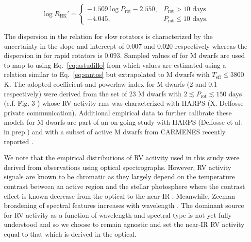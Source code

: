 \begin{equation}
  \log{R_{\text{HK}}'}  =
  \begin{cases}
    -1.509 \log{P_{\text{rot}}} -2.550, & P_{\text{rot}} > 10 \text{ days} \\
    -4.045, & P_{\text{rot}} \leq 10 \text{ days}.
  \end{cases} \label{eq:astudillo}
\end{equation}

\noindent The dispersion in the relation for slow rotators is characterized by the uncertainty in the slope and
intercept of 0.007 and 0.020 respectively whereas the dispersion in \Rhk{} for rapid rotators is 0.093. Sampled
values of \prot{} for M dwarfs are used to map to \Rhk{} using Eq.~\ref{eq:astudillo} from which \sigact{} values
are estimated using a relation similar to Eq.~\ref{eq:santos} but extrapolated to M dwarfs 
with $T_{\text{eff}} \leq 3800$ K. The adopted coefficient and powerlaw index for M dwarfs (2 \mps{} and 0.1
respectively) were derived from the set of 23
M dwarfs with $2 \lesssim P_{\text{rot}} \lesssim 150$ days (c.f. Fig. 3 \citealt{cloutier18})
whose RV activity rms was characterized with HARPS (X. Delfosse private communication).
Additional empirical data to further
calibrate these models for M dwarfs are part of an on-going study with HARPS
(Delfosse et al. in prep.) and with a subset of active M dwarfs from CARMENES recently reported \citep{tal-or18}.

We note that the
empirical distributions of RV activity used in this study were derived from observations using optical
spectrographs. However, RV activity signals are known to be chromatic as they largely
depend on the temperature contrast between an active region and the stellar photosphere where the contrast
effect is known decrease from the optical to the near-IR
\citep[e.g.][]{martin06,huelamo08,prato08,reiners10,mahmud11}. Meanwhile, Zeeman broadening of spectral
features increases with wavelength \citep{reiners13}. The dominant source for RV activity as a function of wavelength
and spectral type is not yet fully understood \citep{moutou17} and so we choose to remain agnostic and set
the near-IR RV activity equal to that which is derived in the optical.


